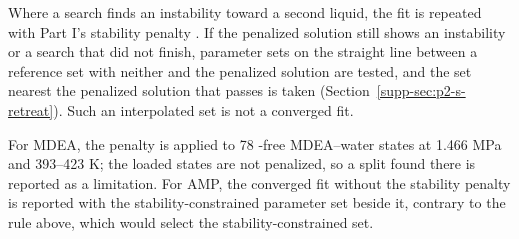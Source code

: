 Where a search finds an instability toward a second liquid, the fit is repeated with Part I's stability penalty \cite[Eq.~30]{PolleyPartI}.
If the penalized solution still shows an instability or a search that did not finish, parameter sets on the straight line between a reference set with neither and the penalized solution are tested, and the set nearest the penalized solution that passes is taken (Section~\ref{supp-sec:p2-s-retreat}).
Such an interpolated set is not a converged fit.

For MDEA, the penalty is applied to 78 \COtwo-free MDEA--water states at 1.466 MPa and 393--423 K; the loaded states are not penalized, so a split found there is reported as a limitation.
For AMP, the converged fit without the stability penalty is reported with the stability-constrained parameter set beside it, contrary to the rule above, which would select the stability-constrained set.
